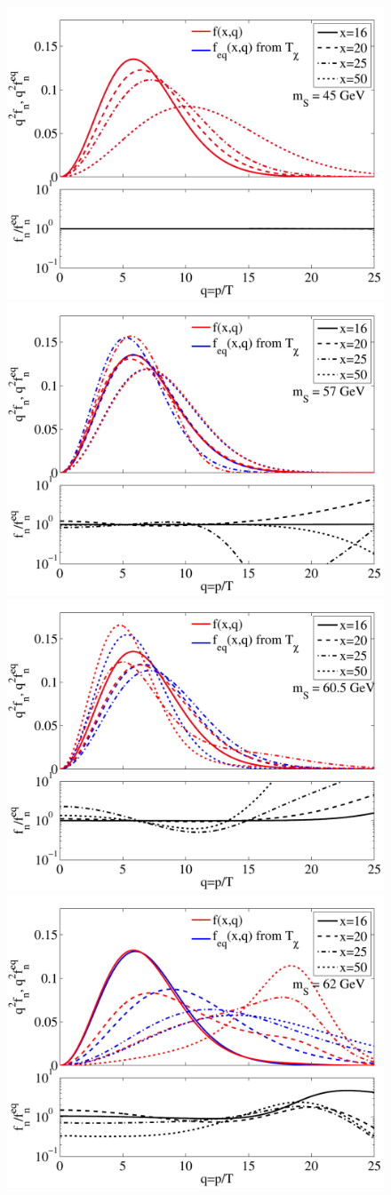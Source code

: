 \documentclass[twocolumn,showpacs,amsmath,amssymb,superscriptaddress,nofootinbib]{revtex4-1}
\begin{document}
\begin{figure}[t!]
  \includegraphics[width=0.66\columnwidth]{phasespace_distr_mDM45_kCM}
  \includegraphics[width=0.66\columnwidth]{phasespace_distr_mDM57_kCM}
  \includegraphics[width=0.66\columnwidth]{phasespace_distr_mDM60_5_kCM}\\
  \includegraphics[width=0.66\columnwidth]{phasespace_distr_mDM62_kCM}

\end{figure}
\end{document}
